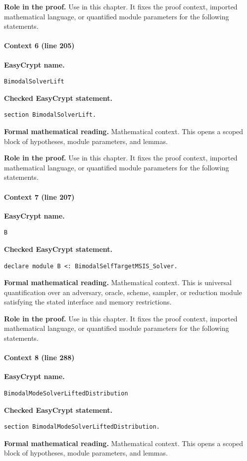 \noindent\textbf{Role in the proof.}
Use in this chapter. It fixes the proof context, imported mathematical language, or quantified module parameters for the following statements.

\paragraph{Context 6 (line 205)}
\noindent\textbf{EasyCrypt name.}
\begin{lstlisting}[language=EasyCrypt,basicstyle=\ttfamily\scriptsize]
BimodalSolverLift
\end{lstlisting}
\noindent\textbf{Checked EasyCrypt statement.}
\begin{lstlisting}[language=EasyCrypt,basicstyle=\ttfamily\scriptsize]
section BimodalSolverLift.
\end{lstlisting}
\noindent\textbf{Formal mathematical reading.}
Mathematical context. This opens a scoped block of hypotheses, module parameters, and lemmas.

\noindent\textbf{Role in the proof.}
Use in this chapter. It fixes the proof context, imported mathematical language, or quantified module parameters for the following statements.

\paragraph{Context 7 (line 207)}
\noindent\textbf{EasyCrypt name.}
\begin{lstlisting}[language=EasyCrypt,basicstyle=\ttfamily\scriptsize]
B
\end{lstlisting}
\noindent\textbf{Checked EasyCrypt statement.}
\begin{lstlisting}[language=EasyCrypt,basicstyle=\ttfamily\scriptsize]
declare module B <: BimodalSelfTargetMSIS_Solver.
\end{lstlisting}
\noindent\textbf{Formal mathematical reading.}
Mathematical context. This is universal quantification over an adversary, oracle, scheme, sampler, or reduction module satisfying the stated interface and memory restrictions.

\noindent\textbf{Role in the proof.}
Use in this chapter. It fixes the proof context, imported mathematical language, or quantified module parameters for the following statements.

\paragraph{Context 8 (line 288)}
\noindent\textbf{EasyCrypt name.}
\begin{lstlisting}[language=EasyCrypt,basicstyle=\ttfamily\scriptsize]
BimodalModeSolverLiftedDistribution
\end{lstlisting}
\noindent\textbf{Checked EasyCrypt statement.}
\begin{lstlisting}[language=EasyCrypt,basicstyle=\ttfamily\scriptsize]
section BimodalModeSolverLiftedDistribution.
\end{lstlisting}
\noindent\textbf{Formal mathematical reading.}
Mathematical context. This opens a scoped block of hypotheses, module parameters, and lemmas.

